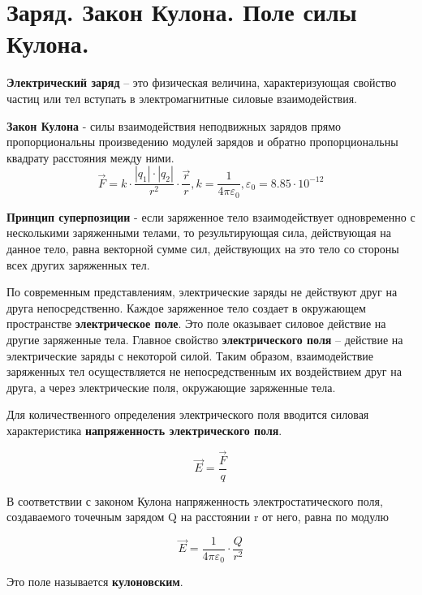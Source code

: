 \section{Заряд. Закон Кулона. Поле силы Кулона.}

\textbf{Электрический заряд} – это физическая величина, характеризующая свойство частиц или тел вступать в электромагнитные силовые взаимодействия.

\textbf{Закон Кулона} - силы взаимодействия неподвижных зарядов прямо пропорциональны произведению модулей зарядов и обратно пропорциональны квадрату расстояния между ними.
\[
\vec{F} =k \cdot \frac{|q_1| \cdot |q_2|}{r^2} \cdot \frac{\vec{r}}{r}, k = \frac{1}{4\pi\varepsilon_0}, \varepsilon_0 = 8.85 \cdot 10^{-12}
\]

\textbf{Принцип суперпозиции} - если заряженное тело взаимодействует одновременно с несколькими заряженными телами, то результирующая сила, действующая на данное тело, равна векторной сумме сил, действующих на это тело со стороны всех других заряженных тел.

По современным представлениям, электрические заряды не действуют друг на друга непосредственно. Каждое заряженное тело создает в окружающем пространстве \textbf{электрическое поле}. Это поле оказывает силовое действие на другие заряженные тела. Главное свойство \textbf{электрического поля} – действие на электрические заряды с некоторой силой. Таким образом, взаимодействие заряженных тел осуществляется не непосредственным их воздействием друг на друга, а через электрические поля, окружающие заряженные тела.

Для количественного определения электрического поля вводится силовая характеристика \textbf{напряженность электрического поля}.

\[
\vec{E}=\frac{\vec{F}}{q}
\]

В соответствии с законом Кулона напряженность электростатического поля, создаваемого точечным зарядом Q на расстоянии r от него, равна по модулю

\[
\vec{E}= \frac{1}{4 \pi \varepsilon_0}\cdot\frac{Q}{r^2}
\]

Это поле называется \textbf{кулоновским}.
